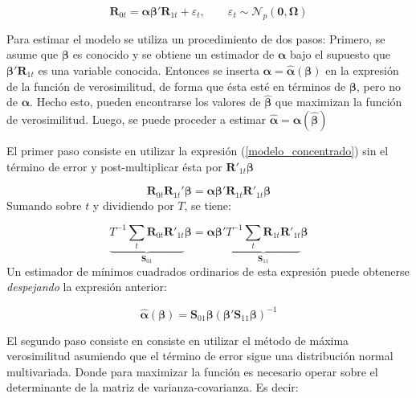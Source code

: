 \documentclass[12pt, twoside]{book}\usepackage[]{graphicx}\usepackage[]{color}
\numberwithin{equation}{section}
\numberwithin{theorem}{section}
\numberwithin{teorema}{section}
\numberwithin{defi}{section}
\numberwithin{prop}{section}
\numberwithin{defi}{section}
\theoremstyle{plain}
\begin{document}
\begin{equation}\label{modelo_concentrado}
\mathbf{R}_{0t} = \boldsymbol{\alpha\beta}'\mathbf{R}_{1t}+\varepsilon_{t}, \qquad \varepsilon_{t}\sim \mathcal{N}_{p}(\boldsymbol{0,\Omega})
\end{equation}

Para estimar el modelo se utiliza un procedimiento de dos pasos: Primero, se asume que $\boldsymbol{\beta}$ es conocido y se obtiene un estimador de $\boldsymbol{\alpha}$ bajo el supuesto que $\boldsymbol{\beta}'\mathbf{R}_{1t}$ es una variable conocida. Entonces se inserta $\boldsymbol{\alpha}=\hat{\boldsymbol{\alpha}}(\boldsymbol{\beta})$ en la expresión de la función de verosimilitud, de forma que ésta esté en términos de $\boldsymbol{\beta}$, pero no de $\boldsymbol{\alpha}$. Hecho esto, pueden encontrarse los valores de $\hat{\boldsymbol{\beta}}$ que maximizan la función de verosimilitud. Luego, se puede proceder a estimar $\hat{\boldsymbol{\alpha}}=\boldsymbol{\alpha}(\hat{\boldsymbol{\beta}})$  

El primer paso consiste en utilizar la expresión (\ref{modelo_concentrado}) sin el término de error y post-multiplicar ésta por $\mathbf{R}'_{1t}\boldsymbol{\beta}$

\begin{equation}
\mathbf{R}_{0t}\mathbf{R}_{1t}'\boldsymbol{\beta} = \boldsymbol{\alpha\beta}'\mathbf{R}_{1t}\mathbf{R}'_{1t}\boldsymbol{\beta}
\end{equation}
Sumando sobre $t$ y dividiendo por $T$, se tiene: 

\begin{equation}
\underbrace{T^{-1}\sum_{t}\mathbf{R}_{0t}\mathbf{R}'_{1t}}_{\mathbf{S}_{01}}\boldsymbol{\beta} = 
\boldsymbol{\alpha\beta}'\underbrace{T^{-1}\sum_{t}\mathbf{R}_{1t}\mathbf{R}'_{1t}}_{\mathbf{S}_{11}}\boldsymbol{\beta}
\end{equation}
Un estimador de mínimos cuadrados ordinarios de esta expresión puede obtenerse \textit{despejando} la expresión anterior: 

\begin{equation}\label{resumido}
\hat{\boldsymbol{\alpha}}(\boldsymbol{\beta}) = \mathbf{S}_{01}\boldsymbol{\beta}(\boldsymbol{\beta}'\mathbf{S}_{11}\boldsymbol{\beta})^{-1}
\end{equation}

El segundo paso consiste en consiste en utilizar el método de máxima verosimilitud asumiendo que el término de error sigue una distribución normal multivariada. Donde para maximizar la función es necesario operar sobre el determinante de la matriz de varianza-covarianza. Es decir: 
\end{document}
